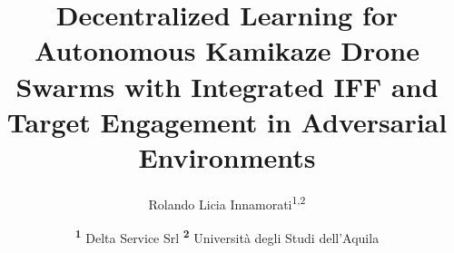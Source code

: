 \documentclass[twocolumn]{NobArticle}
\title{Decentralized Learning for Autonomous Kamikaze Drone Swarms with Integrated IFF and Target Engagement in Adversarial Environments}
\author{
    Rolando Licia Innamorati\textsuperscript{1,2}
}
\date{
    \textsuperscript{\textbf{1}}
    Delta Service Srl
    \textsuperscript{\textbf{2}}
    Università degli Studi dell'Aquila
}
\begin{document}
\small
\maketitle











\printbibliography
\end{document}
